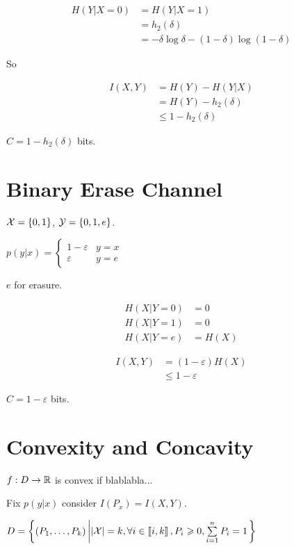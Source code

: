 \[
    \begin{aligned}
        H(Y \vert X=0) &= H(Y \vert X=1)\\
        &= h_2(\delta)\\
        &= -\delta \log \delta - (1-\delta) \log (1-\delta)
    \end{aligned}
\]

So

\[
    \begin{aligned}
        I(X,Y) &= H(Y) - H(Y\vert X)\\
        &= H(Y) - h_2(\delta)\\
        &\leqslant 1 - h_2(\delta)
    \end{aligned}
\]

$C = 1-h_2(\delta)$ bits.

\section{Binary Erase Channel}

$\mathcal{X} = \left\{ 0,1 \right\}$, $\mathcal{Y}= \left\{ 0,1,e \right\}$.

$p(y\vert x) = \begin{cases}
    1-\varepsilon & y=x\\
    \varepsilon & y=e
\end{cases}$

$e$ for erasure.

\[
    \begin{aligned}
        H(X \vert Y = 0) &= 0\\
        H(X \vert Y = 1) &= 0\\
        H(X \vert Y = e) &= H(X)
    \end{aligned}
\]

\[
    \begin{aligned}
        I(X,Y) &= (1-\varepsilon) H(X)\\
        &\leqslant 1-\varepsilon
    \end{aligned}
\]

$C = 1-\varepsilon$ bits.

\section{Convexity and Concavity}

$f : D \to \mathbb{R}$ is convex if blablabla...

Fix $p(y\vert x)$ consider $I(P_x) = I(X,Y) $. 

$D = \left\{ (P_1,\ldots,P_k) \left\vert \left\lvert\mathcal{X}\right\rvert = k, \forall i\in\left\llbracket i,k \right\rrbracket, P_i\geqslant 0, \sum\limits_{i=1}^n P_i = 1\right. \right\}$

